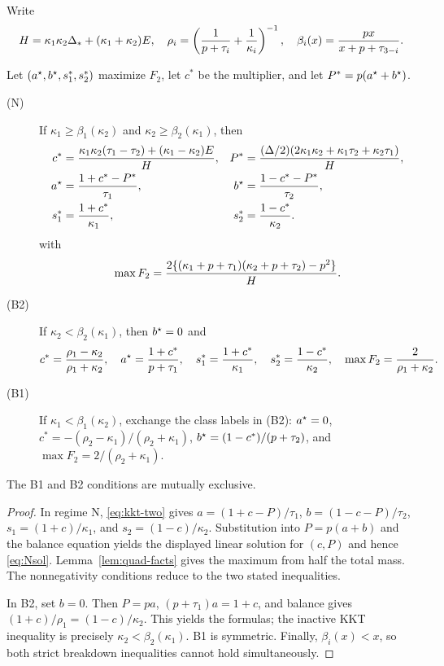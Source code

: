 Write
\begin{equation}\label{eq:two-shorthands}
H=\kappa_1\kappa_2\Delta_*+(\kappa_1+\kappa_2)E,
\quad
\rho_i=\left({1\over p+\tau_i}+{1\over\kappa_i}\right)^{-1},
\quad
\beta_i(x)={px\over x+p+\tau_{3-i}}.
\end{equation}

\begin{theorem}\label{thm:two-sided}
Let $(a^{\star},b^{\star},s_1^*,s_2^*)$ maximize $F_2$, let $c^*$ be the multiplier, and let $P^*=p(a^{\star}+b^{\star})$.
\begin{description}
\item[(N)] If $\kappa_1\ge\beta_1(\kappa_2)$ and $\kappa_2\ge\beta_2(\kappa_1)$, then
\begin{align}
 c^*&={\kappa_1\kappa_2(\tau_1-\tau_2)+(\kappa_1-\kappa_2)E\over H},
& P^*&={ (\Delta/2)(2\kappa_1\kappa_2+\kappa_1\tau_2+\kappa_2\tau_1)\over H},\nonumber\\
 a^{\star}&={1+c^*-P^*\over\tau_1},&
 b^{\star}&={1-c^*-P^*\over\tau_2},\nonumber\\
 s_1^*&={1+c^*\over\kappa_1},&
 s_2^*&={1-c^*\over\kappa_2}.\label{eq:Nsol}
\end{align}
with
\[
\max F_2={2\{(\kappa_1+p+\tau_1)(\kappa_2+p+\tau_2)-p^2\}\over H}.
\]
\item[(B2)] If $\kappa_2<\beta_2(\kappa_1)$, then $b^{\star}=0$ and
\[
c^*={\rho_1-\kappa_2\over\rho_1+\kappa_2},\quad
a^{\star}={1+c^*\over p+\tau_1},\quad
s_1^*={1+c^*\over\kappa_1},\quad
s_2^*={1-c^*\over\kappa_2},\quad
\max F_2={2\over\rho_1+\kappa_2}.
\]
\item[(B1)] If $\kappa_1<\beta_1(\kappa_2)$, exchange the class labels in (B2): $a^{\star}=0$, $c^*=-(\rho_2-\kappa_1)/(\rho_2+\kappa_1)$, $b^{\star}=(1-c^*)/(p+\tau_2)$, and $\max F_2=2/(\rho_2+\kappa_1)$.
\end{description}
The B1 and B2 conditions are mutually exclusive.
\end{theorem}
\begin{proof}
In regime N, \eqref{eq:kkt-two} gives
$a=(1+c-P)/\tau_1$, $b=(1-c-P)/\tau_2$, $s_1=(1+c)/\kappa_1$, and $s_2=(1-c)/\kappa_2$. Substitution into $P=p(a+b)$ and the balance equation yields the displayed linear solution for $(c,P)$ and hence \eqref{eq:Nsol}. Lemma~\ref{lem:quad-facts} gives the maximum from half the total mass. The nonnegativity conditions reduce to the two stated inequalities.

In B2, set $b=0$. Then $P=pa$, $(p+\tau_1)a=1+c$, and balance gives $(1+c)/\rho_1=(1-c)/\kappa_2$. This yields the formulas; the inactive KKT inequality is precisely $\kappa_2<\beta_2(\kappa_1)$. B1 is symmetric. Finally, $\beta_i(x)<x$, so both strict breakdown inequalities cannot hold simultaneously.
\end{proof}

